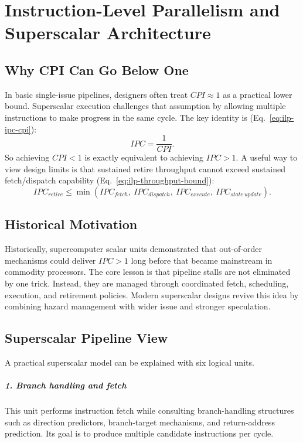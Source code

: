 \chapter{Instruction-Level Parallelism and Superscalar Architecture}\label{ch:ilp-superscalar}

\section{Why CPI Can Go Below One}\label{sec:ilp-cpi-ipc}
In basic single-issue pipelines, designers often treat $CPI\approx 1$ as a practical lower bound.
Superscalar execution challenges that assumption by allowing multiple instructions to make progress in the same cycle.
The key identity is (Eq.~\eqref{eq:ilp-ipc-cpi}):
\begin{equation}\label{eq:ilp-ipc-cpi}
IPC=\frac{1}{CPI}.
\end{equation}
So achieving $CPI<1$ is exactly equivalent to achieving $IPC>1$.
A useful way to view design limits is that sustained retire throughput cannot exceed sustained fetch/dispatch capability (Eq.~\eqref{eq:ilp-throughput-bound}):
\begin{equation}\label{eq:ilp-throughput-bound}
IPC_{retire} \le \min\!\left(IPC_{fetch},\ IPC_{dispatch},\ IPC_{execute},\ IPC_{state\ update}\right).
\end{equation}

\section{Historical Motivation}\label{sec:ilp-history}
Historically, supercomputer scalar units demonstrated that out-of-order mechanisms could deliver $IPC>1$ long before that became mainstream in commodity processors.
The core lesson is that pipeline stalls are not eliminated by one trick.
Instead, they are managed through coordinated fetch, scheduling, execution, and retirement policies.
Modern superscalar designs revive this idea by combining hazard management with wider issue and stronger speculation.

\section{Superscalar Pipeline View}\label{sec:ilp-pipeline-model}
A practical superscalar model can be explained with six logical units.
\paragraph{1. Branch handling and fetch}\label{par:ilp-fetch}
This unit performs instruction fetch while consulting branch-handling structures such as direction predictors, branch-target mechanisms, and return-address prediction.
Its goal is to produce multiple candidate instructions per cycle.
